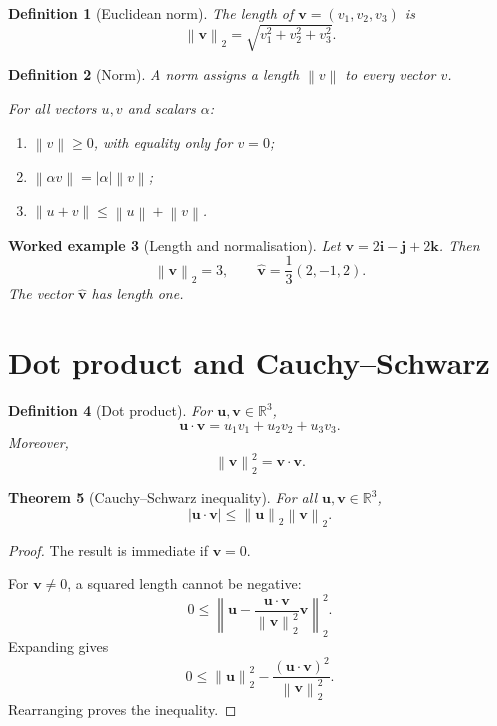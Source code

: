 \documentclass[11pt,a5paper,oneside,openany]{scrreprt}
\theoremstyle{notes}
\newtheorem{theorem}{Theorem}[section]
\theoremstyle{definitions}
\newtheorem{definition}[theorem]{Definition}
\newtheorem{example}[theorem]{Worked example}
\newcommand{\R}{\mathbb{R}}
\newcommand{\norm}[1]{\left\lVert #1\right\rVert}
\begin{document}
\begin{definition}[Euclidean norm]
The length of $\mathbf v=(v_1,v_2,v_3)$ is
\[
  \boxed{\norm{\mathbf v}_2=\sqrt{v_1^2+v_2^2+v_3^2}}.
\]
\end{definition}

\begin{definition}[Norm]
A norm assigns a length $\norm v$ to every vector $v$.

For all vectors $u,v$ and scalars $\alpha$:
\begin{enumerate}[label=(\roman*),leftmargin=2.7em]
  \item $\norm v\ge0$, with equality only for $v=0$;
  \item $\norm{\alpha v}=|\alpha|\norm v$;
  \item $\norm{u+v}\le\norm u+\norm v$.
\end{enumerate}
\end{definition}

\begin{example}[Length and normalisation]
Let $\mathbf v=2\mathbf i-\mathbf j+2\mathbf k$.  Then
\[
  \norm{\mathbf v}_2=3,
  \qquad
  \widehat{\mathbf v}=\frac13(2,-1,2).
\]
The vector $\widehat{\mathbf v}$ has length one.
\end{example}

\section{Dot product and Cauchy--Schwarz}

\begin{definition}[Dot product]
For $\mathbf u,\mathbf v\in\R^3$,
\[
  \boxed{\mathbf u\cdot\mathbf v
  =u_1v_1+u_2v_2+u_3v_3}.
\]
Moreover,
\[
  \norm{\mathbf v}_2^2
  =\mathbf v\cdot\mathbf v.
\]
\end{definition}

\newpage
\begin{theorem}[Cauchy--Schwarz inequality]
For all $\mathbf u,\mathbf v\in\R^3$,
\[
  \boxed{|\mathbf u\cdot\mathbf v|
  \le \norm{\mathbf u}_2\norm{\mathbf v}_2}.
\]
\end{theorem}

\begin{proof}
The result is immediate if $\mathbf v=0$.

For $\mathbf v\ne0$, a squared length cannot be negative:
\[
  0\le
  \norm{\mathbf u-
  \frac{\mathbf u\cdot\mathbf v}
       {\norm{\mathbf v}_2^2}\mathbf v}_2^2.
\]
Expanding gives
\[
  0\le \norm{\mathbf u}_2^2
  -\frac{(\mathbf u\cdot\mathbf v)^2}
        {\norm{\mathbf v}_2^2}.
\]
Rearranging proves the inequality.
\end{proof}
\end{document}
